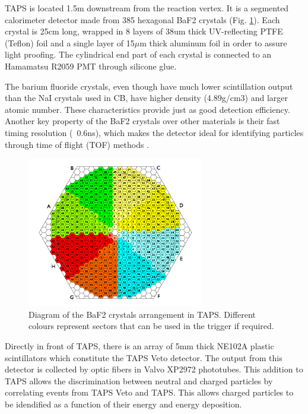 \indent TAPS is located 1.5m downstream from the reaction vertex. It is a segmented calorimeter detector made from 385 hexagonal BaF2 crystals (Fig. \ref{taps}). Each crystal is  25cm long,  wrapped in  8  layers  of 38um thick  UV-reflecting PTFE (Teflon) foil and a single layer of 15$\mu$m thick aluminum foil in order to assure light proofing. The cylindrical end part of each crystal is connected to an Hamamatsu R2059 PMT through silicone glue.

\indent The barium fluoride crystals, even though have much lower scintillation output than the NaI crystals used in CB, have higher density (4.89g/cm3) and larger atomic number. These characteristics provide just as good detection efficiency. Another key property of the BaF2 crystals over other materials is their fast timing resolution (~0.6ns), which makes the detector ideal for identifying particles through time of flight (TOF) methods \cite{novotny}.


\begin{figure}[H]
\begin{center}
\includegraphics[scale=1.4]{pictures/png/taps.png}
\caption{Diagram of the BaF2 crystals arrangement in TAPS. Different colours represent sectors that can be used in the trigger if required.}
\label{taps}
\end{center}
\end{figure} 

\indent Directly  in  front  of  TAPS,  there  is  an  array  of  5mm  thick  NE102A  plastic scintillators which constitute the TAPS Veto detector. The output from this detector is collected by optic fibers in Valvo XP2972 phototubes. This addition to TAPS allows the discrimination between neutral and charged particles by correlating events from TAPS Veto and TAPS. This allows charged particles to be idendified as a function of their energy and energy deposition.

